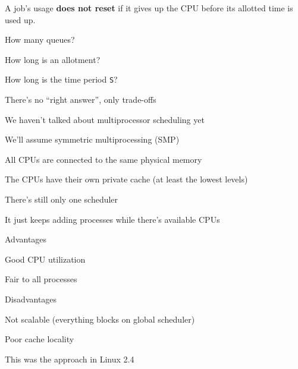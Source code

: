 \begin{slide}

	
	A job's usage \textbf{does not reset} if it gives up the CPU before its allotted time is used up.
	\bigskip
	
	How many queues?
	\bigskip
	
	How long is an allotment?
	\bigskip
	
	How long is the time period \texttt{S}?
	
\end{slide}

  \begin{slide}


    There's no ``right answer'', only trade-offs
    \medskip

    We haven't talked about multiprocessor scheduling yet
    \medskip

    We'll assume symmetric multiprocessing (SMP)

    \leftspace{}All CPUs are connected to the same physical memory

    \leftspace{}The CPUs have their own private cache (at least the lowest levels)

  \end{slide}

  \begin{slide}


    There's still only one scheduler

    \leftspace{}It just keeps adding processes while there's available CPUs
    \medskip

    Advantages

    \leftspace{}Good CPU utilization

    \leftspace{}Fair to all processes
    \medskip

    Disadvantages

    \leftspace{}Not scalable (everything blocks on global scheduler)

    \leftspace{}Poor cache locality
    \medskip

    This was the approach in Linux 2.4

  \end{slide}


